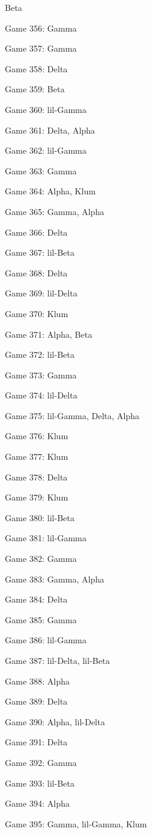 \documentclass{article}
\begin{document}
\begin{multicols}{3}
\begin{compactitem}
Beta
\item Game 356:
Gamma
\item Game 357:
Gamma
\item Game 358:
Delta
\item Game 359:
Beta
\item Game 360:
lil-Gamma
\item Game 361:
Delta, Alpha
\item Game 362:
lil-Gamma
\item Game 363:
Gamma
\item Game 364:
Alpha, Klum
\item Game 365:
Gamma, Alpha
\item Game 366:
Delta
\item Game 367:
lil-Beta
\item Game 368:
Delta
\item Game 369:
lil-Delta
\item Game 370:
Klum
\item Game 371:
Alpha, Beta
\item Game 372:
lil-Beta
\item Game 373:
Gamma
\item Game 374:
lil-Delta
\item Game 375:
lil-Gamma, Delta, Alpha
\item Game 376:
Klum
\item Game 377:
Klum
\item Game 378:
Delta
\item Game 379:
Klum
\item Game 380:
lil-Beta
\item Game 381:
lil-Gamma
\item Game 382:
Gamma
\item Game 383:
Gamma, Alpha
\item Game 384:
Delta
\item Game 385:
Gamma
\item Game 386:
lil-Gamma
\item Game 387:
lil-Delta, lil-Beta
\item Game 388:
Alpha
\item Game 389:
Delta
\item Game 390:
Alpha, lil-Delta
\item Game 391:
Delta
\item Game 392:
Gamma
\item Game 393:
lil-Beta
\item Game 394:
Alpha
\item Game 395:
Gamma, lil-Gamma, Klum

\end{compactitem}
\end{multicols}
\end{document}
